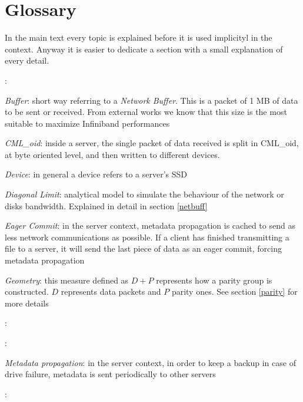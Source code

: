 \chapter{Glossary}
In the main text every topic is explained before it is used implicityl in the
context. Anyway it is easier to dedicate a section with a small explanation of
every detail.

\textit{}:
\vspace{10pt}

\textit{Buffer}: short way referring to a \textit{Network Buffer}. This is a
packet of 1 MB of data to be sent or received. From external works we know that
this size is the most suitable to maximize Infiniband performances\vspace{10pt}

\textit{CML\_oid}: inside a server, the single packet of data received is split
in CML\_oid, at byte oriented level, and then written to different devices.
\vspace{10pt}

\textit{Device}: in general a device refers to a server's SSD
\vspace{10pt}

\textit{Diagonal Limit}: analytical model to simulate the behaviour of the
network or disks bandwidth. Explained in detail in section \ref{netbuff}
\vspace{10pt}

\textit{Eager Commit}: in the server context, metadata propagation is cached to
send as less network communications as possible. If a client has finished
transmitting a file to a server, it will send the last piece of data as an eager
commit, forcing metadata propagation
\vspace{10pt}

\textit{Geometry}: this measure defined as $D+P$ represents how a parity group
is constructed. $D$ represents data packets and $P$ parity ones. See section
\ref{parity} for more details
\vspace{10pt}

\textit{}:
\vspace{10pt}

\textit{}:
\vspace{10pt}

\textit{Metadata propagation}: in the server context, in order to keep a backup
in case of drive failure, metadata is sent periodically to other servers
\vspace{10pt}

\textit{}:
\vspace{10pt}

